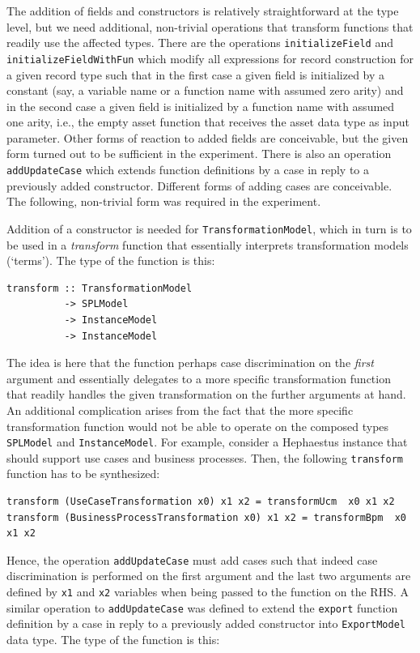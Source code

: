 The addition of fields and constructors is relatively straightforward at the type level, but we need additional, non-trivial operations that transform functions that readily use the affected types. There are the operations \texttt{initializeField} and \texttt{initializeFieldWithFun} which modify all expressions for record construction for a given record type such that in the first case a given field is initialized by a constant (say, a variable name or a function name with assumed zero arity) and in the second case a given field is initialized by a function name with assumed one arity, i.e., the empty asset function that receives the asset data type as input parameter. Other forms of reaction to added fields are conceivable, but the given form turned out to be sufficient in the experiment.
There is also an operation \texttt{addUpdateCase} which extends function definitions by a case in reply to a previously added constructor. Different forms of adding cases are conceivable. The following, non-trivial form was required in the experiment.

Addition of a constructor is needed for \texttt{TransformationModel}, which in turn is to be used in a \emph{transform} function that essentially interprets transformation models (`terms'). The type of the function is this:

\begin{lstlisting}
transform :: TransformationModel
          -> SPLModel
          -> InstanceModel
          -> InstanceModel
\end{lstlisting}

The idea is here that the function perhaps case discrimination on the \emph{first} argument and essentially delegates to a more specific transformation function that readily handles the given transformation on the further arguments at hand. An additional complication arises from the fact that the more specific transformation function would not be able to operate on the composed types \texttt{SPLModel} and \texttt{InstanceModel}. For example, consider a Hephaestus instance that should support use cases and business processes. Then, the following \texttt{transform} function has to be synthesized:

\begin{lstlisting}
transform (UseCaseTransformation x0) x1 x2 = transformUcm  x0 x1 x2
transform (BusinessProcessTransformation x0) x1 x2 = transformBpm  x0 x1 x2
\end{lstlisting}

Hence, the  operation \texttt{addUpdateCase} must add cases such that indeed case discrimination is performed on the first argument and the last two arguments are defined by \texttt{x1} and \texttt{x2} variables when being passed to the function on the RHS.
A similar operation to \texttt{addUpdateCase} was defined to extend the \texttt{export} function definition by a case in reply to a previously added constructor into \texttt{ExportModel} data type. The type of the function is this:


